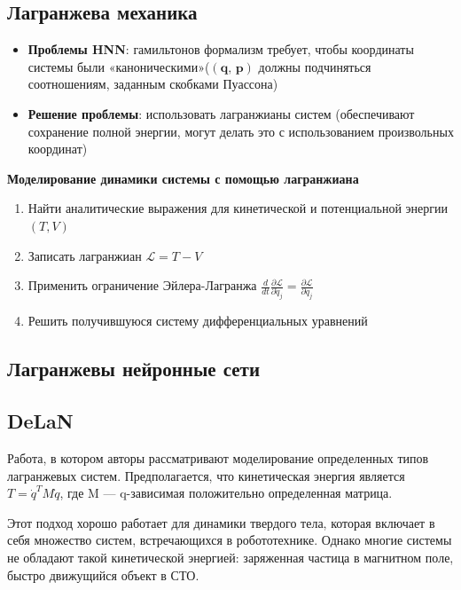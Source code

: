 \documentclass[12pt]{article}
\begin{document}
	\subsection{Лагранжева механика}
	\begin{itemize}
		\item \textbf{Проблемы HNN}: гамильтонов формализм требует, чтобы координаты системы были «каноническими»($(\textbf{q, p})$ должны подчиняться соотношениям, заданным скобками Пуассона) %
		\item \textbf{Решение проблемы}: использовать лагранжианы систем (обеспечивают сохранение полной энергии, могут делать это с использованием произвольных координат)
	\end{itemize}
	
	\textbf{Моделирование динамики системы с помощью лагранжиана}
		\begin{enumerate}
			\item Найти аналитические выражения для кинетической и потенциальной энергии $(T, V )$
			\item Записать лагранжиан $\mathcal{L} = T - V $
			\item Применить ограничение Эйлера-Лагранжа $\frac{d}{d t} \frac{\partial \mathcal{L}}{\partial \dot{q}_{j}} =\frac{\partial \mathcal{L}}{\partial q_{j}} $
			\item Решить получившуюся систему дифференциальных уравнений
		\end{enumerate}

	
	\subsection{Лагранжевы нейронные сети}
	

	
	\subsection{DeLaN}
	Работа, в котором авторы рассматривают моделирование определенных типов лагранжевых систем. Предполагается, что кинетическая энергия является $T = \dot{q}^TM\dot{q}$, где M — q-зависимая положительно определенная матрица. 
	
	Этот подход хорошо работает для динамики твердого тела, которая включает в себя множество систем, встречающихся в робототехнике. Однако многие системы не обладают такой кинетической энергией: заряженная частица в магнитном поле, быстро движущийся объект в СТО.
	
\end{document}
